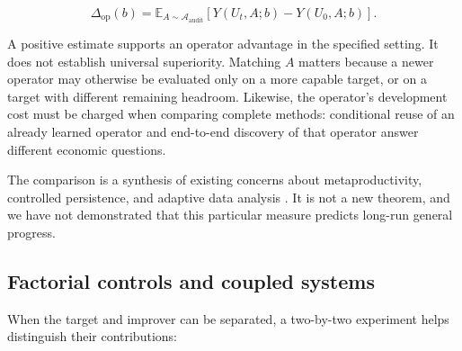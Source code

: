 \documentclass[11pt,american,]{article}
\begin{document}
\[
\Delta_{\mathrm{op}}(b)=\mathbb{E}_{A\sim\mathcal{A}_{\mathrm{audit}}}
\left[Y(U_t,A;b)-Y(U_0,A;b)\right].
\]

A positive estimate supports an operator advantage in the specified
setting. It does not establish universal superiority. Matching \(A\)
matters because a newer operator may otherwise be evaluated only on a
more capable target, or on a target with different remaining headroom.
Likewise, the operator's development cost must be charged when comparing
complete methods: conditional reuse of an already learned operator and
end-to-end discovery of that operator answer different economic
questions.

The comparison is a synthesis of existing concerns about
metaproductivity, controlled persistence, and adaptive data analysis
\citep{hgm2025, pastbench2026, adaptive2015}. It is not a new theorem,
and we have not demonstrated that this particular measure predicts
long-run general progress.

\hypertarget{factorial-controls-and-coupled-systems}{%
\subsection{Factorial controls and coupled
systems}\label{factorial-controls-and-coupled-systems}}

When the target and improver can be separated, a two-by-two experiment
helps distinguish their contributions:
\end{document}
